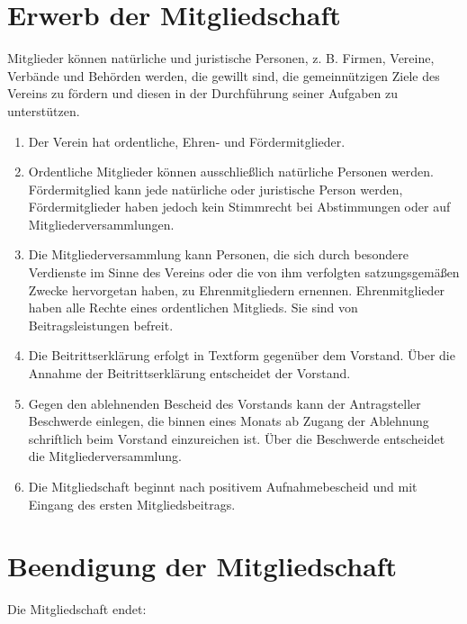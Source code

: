 \documentclass[12pt,a4paper,titlepage]{scrartcl}
\begin{document}
\section{Erwerb der Mitgliedschaft}
Mitglieder können natürliche und juristische Personen, z. B. Firmen, Vereine, Verbände und Behörden werden, die gewillt sind, die gemeinnützigen Ziele des Vereins zu fördern und diesen in der Durchführung seiner Aufgaben zu unterstützen.
\begin{enumerate}
\item Der Verein hat ordentliche, Ehren- und Fördermitglieder.
\item Ordentliche Mitglieder können ausschließlich natürliche Personen werden. Fördermitglied kann jede natürliche oder juristische Person werden, Fördermitglieder haben jedoch kein Stimmrecht bei Abstimmungen oder auf Mitgliederversammlungen.
\item Die Mitgliederversammlung kann Personen, die sich durch besondere Verdienste im Sinne des Vereins oder die von ihm verfolgten satzungsgemäßen Zwecke hervorgetan haben, zu Ehrenmitgliedern ernennen. Ehrenmitglieder haben alle Rechte eines ordentlichen Mitglieds. Sie sind von Beitragsleistungen befreit.
\item Die Beitrittserklärung erfolgt in Textform gegenüber dem Vorstand. Über die Annahme der Beitrittserklärung entscheidet der Vorstand.
\item  Gegen den ablehnenden Bescheid des Vorstands kann der Antragsteller Beschwerde einlegen, die binnen eines Monats ab Zugang der Ablehnung schriftlich beim Vorstand einzureichen ist. Über die Beschwerde entscheidet die Mitgliederversammlung.
\item Die Mitgliedschaft beginnt nach positivem Aufnahmebescheid und mit Eingang des ersten Mitgliedsbeitrags.
\end{enumerate}


\section{Beendigung der Mitgliedschaft}

Die Mitgliedschaft endet:
\end{document}
